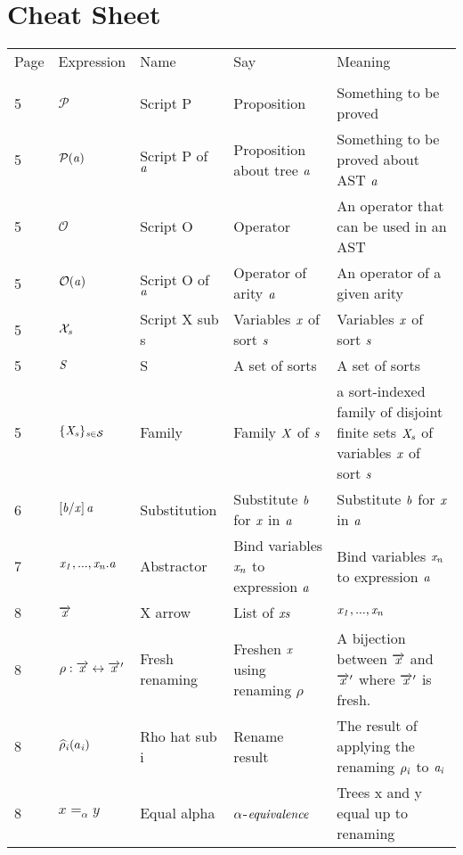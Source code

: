 \documentclass[12pt]{article}
\begin{document}
\section*{Cheat Sheet}
\begin{tabular}[b] {p{} p{} p{} p{} p{}}
Page & Expression & Name & Say & Meaning \\ \\
5& $\mathcal{P}$ & Script P & Proposition & Something to be proved \\
5& $\mathcal{P}(\it{a})$ & Script P of $\it{a}$ & Proposition about tree $\it{a}$ & Something to be proved about AST $\it{a}$ \\
5& $\mathcal{O}$ & Script O & Operator & An operator that can be used in an AST \\
5& $\mathcal{O}(\it{a})$ & Script O of $\it{a}$ & Operator of arity $\it{a}$ & An operator of a given arity \\
5& $\mathcal{X}_{\it{s}}$ & Script X sub s & Variables $\it{x}$ of sort $\it{s}$ & Variables $\it{x}$ of sort $\it{s}$ \\
5& $\it{S} $ & S & A set of sorts & A set of sorts \\
5& $ \{ \it{X}_{s} \} _{\it{s} \in \mathcal{S}}$  & Family & Family $ \it{X} $ of $\it{s}$ & a sort-indexed family of disjoint finite sets $ \it{X}_s $ of variables $\it{x}$ of sort $ \it{s} $\\
6& $\left[ \it{b} / \it{x}\right] \it{a}$ & Substitution & Substitute $\it{b}$ for $\it{x}$ in $\it{a}$ & Substitute  $\it{b}$ for $\it{x}$ in $\it{a}$ \\
7& $ \it{x}_1, ... ,\it{x}_{\it{n}}.\it{a} $ & Abstractor & Bind variables $\it{x_n}$ to expression $\it{a}$ & Bind variables $\it{x_n}$ to expression $\it{a}$ \\
8& $ \overrightarrow{\it{x}} $ & X arrow & List of $\it{x}s$ & $ \it{x}_1, ... ,\it{x}_{\it{n}} $ \\
8& $ \rho : \overrightarrow{\it{x}} \leftrightarrow \overrightarrow{\it{x}}'$ & Fresh renaming & Freshen $ \it{x} $ using renaming $ \rho $ & A bijection between $ \overrightarrow{\it{x}} $ and $ \overrightarrow{\it{x}}' $ where $ \overrightarrow{\it{x}}'$ is fresh. \\
8& $\widehat{\rho}_{\it{i}} (a_{\it{i}})$ & Rho hat sub i & Rename result & The result of applying the renaming $ \rho_ {\it{i}} $ to $ \it{a}_{\it{i}} $ \\
8& $x =_\alpha y$ & Equal alpha & $ \it{\alpha}$-$\it{equivalence} $ & Trees x and y equal up to renaming \\

\end{tabular}
\end{document}
